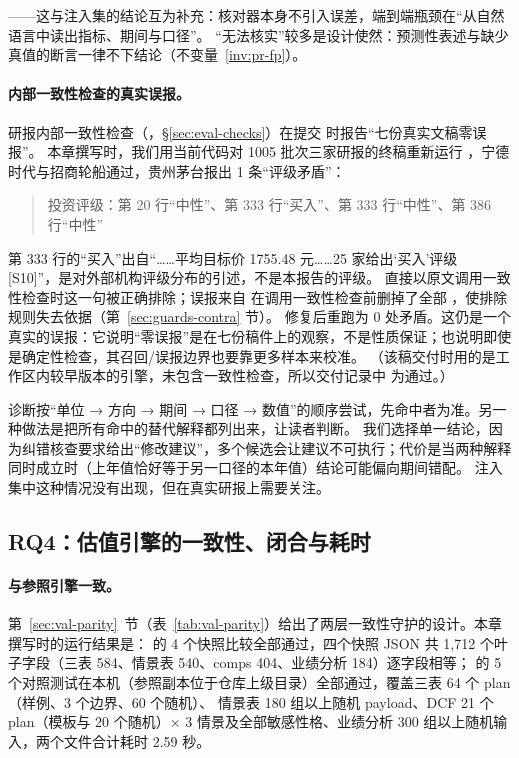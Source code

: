 ——这与注入集的结论互为补充：核对器本身不引入误差，端到端瓶颈在“从自然语言中读出指标、期间与口径”。
“无法核实”较多是设计使然：预测性表述与缺少真值的断言一律不下结论（不变量~\ref{inv:pr-fp}）。

\paragraph{内部一致性检查的真实误报。}研报内部一致性检查（，\S\ref{sec:eval-checks}）在提交  时报告“七份真实文稿零误报”。
本章撰写时，我们用当前代码对 1005 批次三家研报的终稿重新运行 ，宁德时代与招商轮船通过，贵州茅台报出 1 条“评级矛盾”：
\begin{quote}\small
投资评级：第 20 行“中性”、第 333 行“买入”、第 333 行“中性”、第 386 行“中性”
\end{quote}
第 333 行的“买入”出自“……平均目标价 1755.48 元……25 家给出‘买入’评级 [S10]”，是对外部机构评级分布的引述，不是本报告的评级。
直接以原文调用一致性检查时这一句被正确排除；误报来自  在调用一致性检查前删掉了全部 \code{[S编号]}，使排除规则失去依据（第~\ref{sec:guards-contra} 节）。
修复后重跑为 0 处矛盾。这仍是一个真实的误报：它说明“零误报”是在七份稿件上的观察，不是性质保证；也说明即使是确定性检查，其召回/误报边界也要靠更多样本来校准。
（该稿交付时用的是工作区内较早版本的引擎，未包含一致性检查，所以交付记录中  为通过。）

\begin{tradeoff}[：错误类型诊断的顺序]
诊断按“单位 → 方向 → 期间 → 口径 → 数值”的顺序尝试，先命中者为准。另一种做法是把所有命中的替代解释都列出来，让读者判断。
我们选择单一结论，因为纠错核查要求给出“修改建议”，多个候选会让建议不可执行；代价是当两种解释同时成立时（上年值恰好等于另一口径的本年值）结论可能偏向期间错配。
注入集中这种情况没有出现，但在真实研报上需要关注。
\end{tradeoff}

\subsection{RQ4：估值引擎的一致性、闭合与耗时}
\label{sec:exp-rq4}

\paragraph{与参照引擎一致。}第~\ref{sec:val-parity}~节（表~\ref{tab:val-parity}）给出了两层一致性守护的设计。本章撰写时的运行结果是：
 的 4 个快照比较全部通过，四个快照 JSON 共 1,712 个叶子字段（三表 584、情景表 540、comps 404、业绩分析 184）逐字段相等；
 的 5 个对照测试在本机（参照副本位于仓库上级目录）全部通过，覆盖三表 64 个 plan（样例、3 个边界、60 个随机）、
情景表 180 组以上随机 payload、DCF 21 个 plan（模板与 20 个随机）× 3 情景及全部敏感性格、业绩分析 300 组以上随机输入，两个文件合计耗时 2.59 秒。


